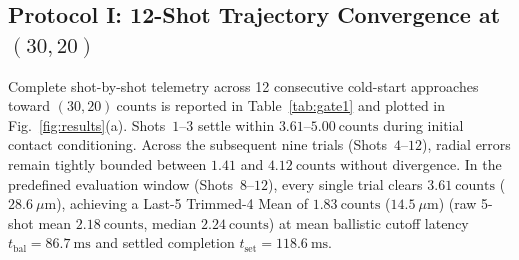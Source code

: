 \documentclass[journal]{IEEEtran}
\begin{document}
\subsection{Protocol I: 12-Shot Trajectory Convergence at $(30, 20)$}

Complete shot-by-shot telemetry across 12 consecutive cold-start approaches toward $(30, 20)\ \text{counts}$ is reported in Table~\ref{tab:gate1} and plotted in Fig.~\ref{fig:results}(a). Shots~$1\text{--}3$ settle within $3.61\text{--}5.00\ \text{counts}$ during initial contact conditioning. Across the subsequent nine trials (Shots~$4\text{--}12$), radial errors remain tightly bounded between $1.41$ and $4.12\ \text{counts}$ without divergence. In the predefined evaluation window (Shots~$8\text{--}12$), every single trial clears $3.61\ \text{counts}$ ($28.6\ \mu\text{m}$), achieving a Last-5 Trimmed-4 Mean of $1.83\ \text{counts}$ ($14.5\ \mu\text{m}$) (raw 5-shot mean $2.18\ \text{counts}$, median $2.24\ \text{counts}$) at mean ballistic cutoff latency $t_{\text{bal}} = 86.7\ \text{ms}$ and settled completion $t_{\text{set}} = 118.6\ \text{ms}$.
\end{document}
